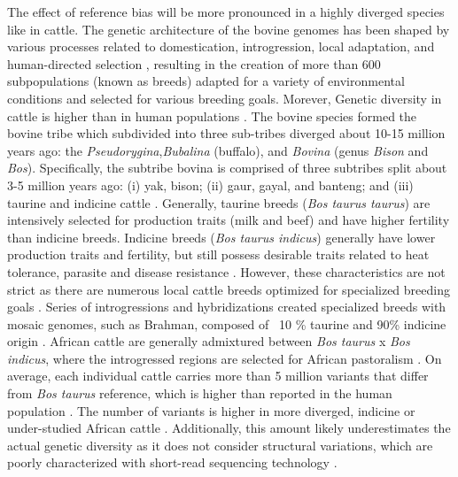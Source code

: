 \documentclass[../main.tex]{subfiles}
\begin{document}
The effect of reference bias will be more pronounced in a highly diverged species like in cattle. The genetic architecture of the bovine genomes has been shaped by various processes related to domestication, introgression, local adaptation, and human-directed selection \citep{zhang2020evolution}, resulting in the creation of more than 600 subpopulations (known as breeds) adapted for a variety of environmental conditions and selected for various breeding goals. Morever, Genetic diversity in cattle is higher than in human populations \citep{charlier2016ngs}. The bovine species formed the bovine tribe which subdivided into three sub-tribes diverged about 10-15 million years ago: the \emph{Pseudorygina},\emph{Bubalina} (buffalo), and \emph{Bovina} (genus \emph{Bison} and \emph{Bos}). Specifically, the subtribe bovina is comprised of three subtribes split about 3-5 million years ago: (i) yak, bison; (ii) gaur, gayal, and banteng; and (iii) taurine and indicine cattle \citep{pitt2019domestication}. Generally, taurine breeds (\emph{Bos taurus taurus}) are intensively selected for production traits (milk and beef) and have higher fertility than indicine breeds. Indicine breeds (\emph{Bos taurus indicus})  generally have lower production traits and fertility, but still possess desirable traits related to heat tolerance, parasite and disease resistance \citep{Low2020}. However, these characteristics are not strict as there are numerous local cattle breeds optimized for specialized breeding goals \citep{signer2017population,upadhyay2019genomic}. Series of introgressions and hybridizations created specialized breeds with mosaic genomes, such as Brahman, composed of ~10 \% taurine and 90\% indicine origin \citep{koufariotis2018sequencing}. African cattle are generally admixtured between \emph{Bos taurus} x \emph{Bos indicus}, where the introgressed regions are selected for African pastoralism \citep{kim2020mosaic}. On average, each individual cattle carries more than 5 million variants that differ from \emph{Bos taurus} reference, which is higher than reported in the human population \citep{daetwyler2014whole,sudmant2015integrated}. The number of variants is higher in more diverged, indicine \citep{koufariotis2018sequencing} or under-studied African cattle \citep{kim2020mosaic,kim2017genome}. Additionally, this amount likely underestimates the actual genetic diversity as it does not consider structural variations, which are poorly characterized with short-read sequencing technology \citep{mahmoud2019structural,chaisson2019multi}. 
\end{document}

